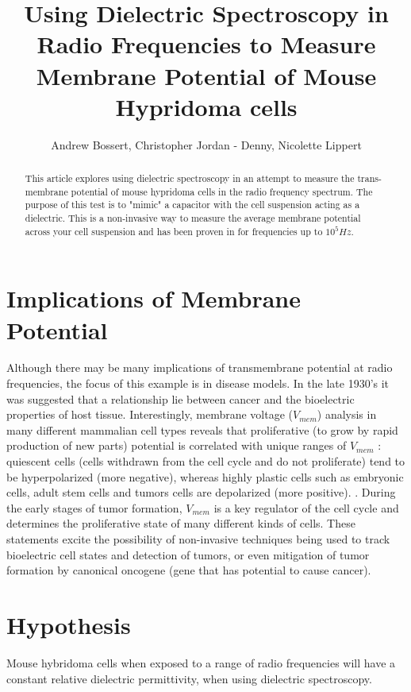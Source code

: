 \documentclass[journal]{IEEEtran}
\title{Using Dielectric Spectroscopy in Radio Frequencies to Measure Membrane Potential of Mouse Hypridoma cells}
\author{Andrew Bossert, Christopher Jordan - Denny, Nicolette Lippert}
\begin{document}
\maketitle


\begin{abstract}
This article explores using dielectric spectroscopy in an attempt to measure the trans-membrane potential of mouse hypridoma cells in the radio frequency spectrum. The purpose of this test is to "mimic" a capacitor with the cell suspension acting as a dielectric. This is a non-invasive way to measure the average membrane potential across your cell suspension and has been proven in \cite{Dielectric Spectroscopy} for frequencies up to \textbf{$10^5 Hz$}.
\end{abstract}

\section{Implications of Membrane Potential}
Although there may be many implications of transmembrane potential at radio frequencies, the focus of this example is in disease models. In the late 1930's it was suggested that a relationship lie between cancer and the bioelectric properties of host tissue. Interestingly, membrane voltage ($V_{mem}$) analysis in many different mammalian cell types reveals that proliferative (to grow by rapid production of new parts) potential is correlated with unique ranges of $V_{mem}$ : quiescent cells (cells withdrawn from the cell cycle and do not proliferate) tend to be hyperpolarized (more negative), whereas highly plastic cells such as embryonic cells, adult stem cells and tumors cells are depolarized (more positive). \cite{TMP-implications}. During the early stages of tumor formation, $V_{mem}$ is a key regulator of the cell cycle and determines the proliferative state of many different kinds of cells. These statements excite the possibility of non-invasive techniques being used to track bioelectric cell states and detection of tumors, or even mitigation of tumor formation by canonical oncogene (gene that has potential to cause cancer).

\section{Hypothesis}
Mouse hybridoma cells when exposed to a range of radio frequencies will have a constant relative dielectric permittivity, when using dielectric spectroscopy. 
\end{document}
